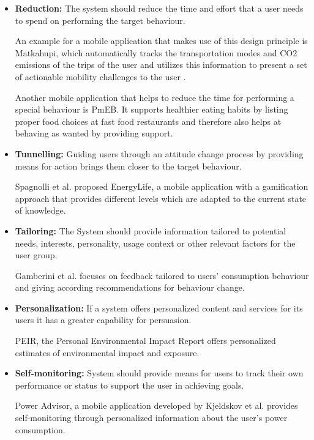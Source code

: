 \begin{itemize}
	\item \textbf{Reduction:}
	The system should reduce the time and effort that a user needs to spend on performing the target behaviour.
	
	An example for a mobile application that makes use of this design principle is Matkahupi, which automatically tracks the transportation modes and CO2 emissions of the trips of the user and utilizes this information to present a set of actionable mobility challenges to the user \cite{jylha2013matkahupi}.
	
	Another mobile application that helps to reduce the time for performing a special behaviour is PmEB. It supports healthier eating habits by listing proper food choices at fast food restaurants \cite{lee2006pmeb} and therefore also helps at behaving as wanted by providing support.
		
	\item \textbf{Tunnelling:}
	Guiding users through an attitude change process by providing means for action brings them closer to the target behaviour.
	
	Spagnolli et al. \cite{spagnolli2011eco} proposed EnergyLife, a mobile application with a gamification approach that provides different levels which are adapted to the current state of knowledge.
	
	\item \textbf{Tailoring:}
	The System should provide information tailored to potential needs, interests, personality, usage context or other relevant factors for the user group.
	
	Gamberini et al. \cite{gamberini2012tailoring} focuses on feedback tailored to users' consumption behaviour and giving according recommendations for behaviour change.
	
	\item \textbf{Personalization:}	
	If a system offers personalized content and services for its users it has a greater capability for persuasion.
	
	PEIR, the Personal Environmental Impact Report \cite{mun2009peir} offers personalized estimates of environmental impact and exposure.
	
	\item \textbf{Self-monitoring:}
	System should provide means for users to track their own performance or status to support the user in achieving goals.
	
	Power Advisor, a mobile application developed by Kjeldskov et al. \cite{kjeldskov2012using} provides self-monitoring through personalized information about the user’s power consumption.
	

\end{itemize}
